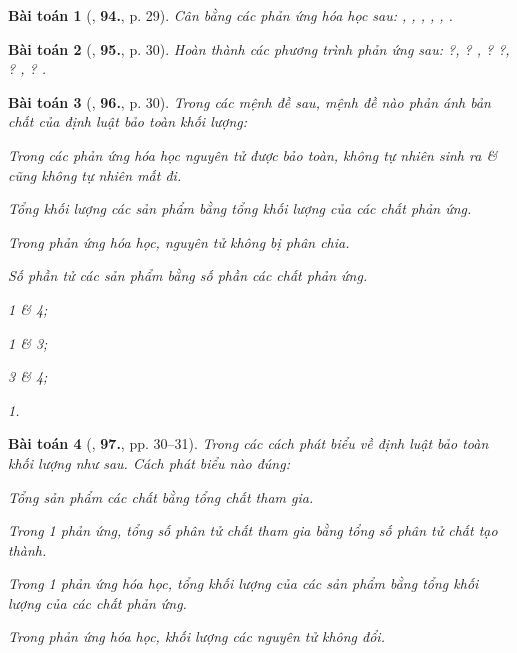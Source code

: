 \documentclass{article}
\numberwithin{equation}{section}
\newtheorem{baitoan}{Bài toán}
\begin{document}
\begin{baitoan}[\cite{An2011}, \textbf{94.}, p. 29]
	Cân bằng các phản ứng hóa học sau: \emph{, , , , , }.
\end{baitoan}

\begin{baitoan}[\cite{An2011}, \textbf{95.}, p. 30]
	Hoàn thành các phương trình phản ứng sau: \emph{ ?,  ? ,  ?  ?,  ? ,  ? }.
\end{baitoan}

\begin{baitoan}[\cite{An2011}, \textbf{96.}, p. 30]
	Trong các mệnh đề sau, mệnh đề nào phản ánh bản chất của định luật bảo toàn khối lượng:
	\begin{enumerate*}
		\item[\textbf{1.}] Trong các phản ứng hóa học nguyên tử được bảo toàn, không tự nhiên sinh ra \& cũng không tự nhiên mất đi.
		\item[\textbf{2.}] Tổng khối lượng các sản phẩm bằng tổng khối lượng của các chất phản ứng.
		\item[\textbf{3.}] Trong phản ứng hóa học, nguyên tử không bị phân chia.
		\item[\textbf{4.}] Số phần tử các sản phẩm bằng số phần các chất phản ứng.
	\end{enumerate*}
	
	\begin{enumerate*}
		\item[{\rm\sf A.}] 1 \& 4;
		\item[{\rm\sf B.}] 1 \& 3;
		\item[{\rm\sf C.}] 3 \& 4;
		\item[{\rm\sf D.}] 1.
	\end{enumerate*}
\end{baitoan}

\begin{baitoan}[\cite{An2011}, \textbf{97.}, pp. 30--31]
	Trong các cách phát biểu về định luật bảo toàn khối lượng như sau. Cách phát biểu nào đúng:
	\begin{enumerate*}
		\item[{\rm\sf A.}] Tổng sản phẩm các chất bằng tổng chất tham gia.
		\item[{\rm\sf B.}] Trong 1 phản ứng, tổng số phân tử chất tham gia bằng tổng số phân tử chất tạo thành.
		\item[{\rm\sf C.}] Trong 1 phản ứng hóa học, tổng khối lượng của các sản phẩm bằng tổng khối lượng của các chất phản ứng.
		\item[{\rm\sf D.}] Trong phản ứng hóa học, khối lượng các nguyên tử không đổi.
	\end{enumerate*}
\end{baitoan}
\end{document}
